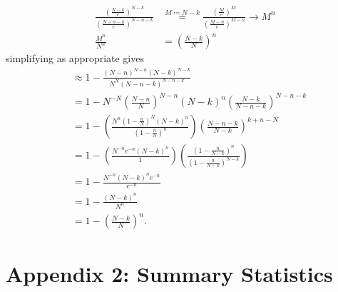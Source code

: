 \documentclass{article}
\theoremstyle{definition}
\begin{document}
\begin{align}
    \frac{\left(\frac{N-k}{e}\right)^{N-k}}{\left(\frac{N-n-k}{e}\right)^{N-n-k}}&\stackrel{M\coloneqq N-k}{=}\frac{\left(\frac{M}{e}\right)^{M}}{\left(\frac{M-n}{e}\right)^{M-n}}\to M^{n}\\
    \frac{M^{n}}{N^{n}}&=\left(\frac{N-k}{N}\right)^{n}
\end{align}
simplifying as appropriate gives
\begin{align}
    & \approx 1- \frac{\left(N-n\right)^{N-n}\left(N-k\right)^{N-k}}{N^{N}\left(N-n-k\right)^{N-n-k}}\\
    &= 1- N^{-N}\left(\frac{N-n}{N}\right)^{N-n}\left(N-k\right)^{n}\left(\frac{N-k}{N-n-k}\right)^{N-n-k}\\
    &=1-\left(\frac{N^{n}\left(1-\frac{n}{N}\right)^{N}\left(N-k\right)^{n}}{\left(1-\frac{n}{N}\right)^{n}}\right)\left(\frac{N-n-k}{N-k}\right)^{k+n-N}\\
    &=1-\left(\frac{N^{-n}e^{-n}\left(N-k\right)^{n}}{1}\right)\left(\frac{\left(1-\frac{n}{N-k}\right)^{n}}{\left(1-\frac{n}{N-k}\right)^{N-k}}\right)\\
    &=1-\frac{N^{-n}\left(N-k\right)^{n}e^{-n}}{e^{-n}}\\
    &=1-\frac{\left(N-k\right)^{n}}{N^{n}}\\
    &=1-\left(\frac{N-k}{N}\right)^{n}.
\end{align}

\section{Appendix 2: Summary Statistics}
\label {Appendix 2}
\end{document}
